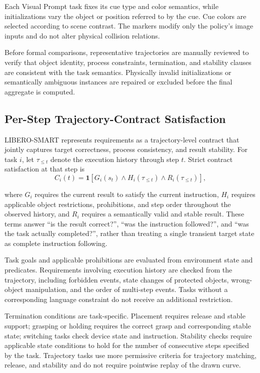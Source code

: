 Each Visual Prompt task fixes its cue type and color semantics, while
initializations vary the object or position referred to by the cue.
Cue colors are selected according to scene contrast. The markers modify
only the policy's image inputs and do not alter physical collision
relations.

Before formal comparisons, representative trajectories are manually
reviewed to verify that object identity, process constraints, termination,
and stability clauses are consistent with the task semantics. Physically
invalid initializations or semantically ambiguous instances are repaired or
excluded before the final aggregate is computed.

\subsection{Per-Step Trajectory-Contract Satisfaction}
\label{app:smart-contract}

LIBERO-SMART represents requirements as a trajectory-level contract that
jointly captures target correctness, process consistency, and result
stability. For task \(i\), let \(\tau_{\leq t}\) denote the execution
history through step \(t\). Strict contract satisfaction at that step is
\begin{equation}
\label{eq:smart-contract}
C_i(t)=\mathbf{1}\!\left[G_i(s_t)\land H_i(\tau_{\leq t})\land R_i(\tau_{\leq t})\right],
\end{equation}

where \(G_i\) requires the current result to satisfy the current
instruction, \(H_i\) requires applicable object restrictions,
prohibitions, and step order throughout the observed history, and \(R_i\)
requires a semantically valid and stable result. These terms answer ``is
the result correct?'', ``was the instruction followed?'', and ``was the
task actually completed?'', rather than treating a single transient
target state as complete instruction following.

Task goals and applicable prohibitions are evaluated from environment
state and predicates. Requirements involving execution history are
checked from the trajectory, including forbidden events, state changes
of protected objects, wrong-object manipulation, and the order of
multi-step events. Tasks without a corresponding language constraint do
not receive an additional restriction.

Termination conditions are task-specific. Placement requires release and
stable support; grasping or holding requires the correct grasp and
corresponding stable state; switching tasks check device state and
instruction. Stability checks require applicable state conditions to
hold for the number of consecutive steps specified by the task.
Trajectory tasks use more permissive criteria for trajectory matching,
release, and stability and do not require pointwise replay of the drawn
curve.

